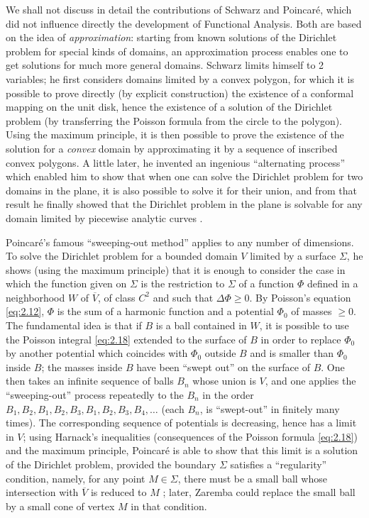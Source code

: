 \documentclass[12pt,a4paper,leqno,twoside]{extbook}
\begin{document}
We shall not discuss in detail the contributions of Schwarz and Poincaré, which did not influence directly the development of Functional Analysis. Both are based on the idea of \emph{approximation}: starting from known solutions of the Dirichlet problem for special kinds of domains, an approximation process enables one to get solutions for much more general domains. Schwarz limits himself to 2 variables; he first considers domains limited by a convex polygon, for which it is possible to prove directly (by explicit construction) the existence of a conformal mapping on the unit disk, hence the existence of a solution of the Dirichlet problem (by transferring the Poisson formula from the circle to the polygon). Using the maximum principle, it is then possible to prove the existence of the solution for a \emph{convex} domain by approximating it by a sequence of inscribed convex polygons. A little later, he invented an ingenious ``alternating process'' which enabled him to show that when one can solve the Dirichlet problem for two domains in the plane, it is also possible to solve it for their union, and from that result he finally showed that the Dirichlet problem in the plane is solvable for any domain limited by piecewise analytic curves \cite[vol.~II, p.~133--210]{196}.

Poincaré's famous ``sweeping-out method'' applies to any number of dimensions. To solve the Dirichlet problem for a bounded domain \(V\) limited by a surface \(\Sigma\), he shows (using the maximum principle) that it is enough to consider the case in which the function given on \(\Sigma\) is the restriction to \(\Sigma\) of a function \(\Phi\) defined in a neighborhood \(W\) of \(\overline{V}\), of class \(C^2\) and such that \(\Delta\Phi \geq 0\). By Poisson's equation \eqref{eq:2.12}, \(\Phi\) is the sum of a harmonic function and a potential \(\Phi_0\) of masses \(\geq 0\). The fundamental idea is that if \(B\) is a ball contained in \(W\), it is possible to use the Poisson integral \eqref{eq:2.18} extended to the surface of \(B\) in order to replace \(\Phi_0\) by another potential which coincides with \(\Phi_0\) outside \(B\) and is smaller than \(\Phi_0\) inside \(B\); the masses inside \(B\) have been ``swept out'' on the surface of \(B\). One then takes an infinite sequence of balls \(B_n\) whose union is \(V\), and one applies the ``sweeping-out'' process repeatedly to the \(B_n\) in the order \(B_1, B_2, B_1, B_2, B_3, B_1, B_2, B_3, B_4, \ldots\) (each \(B_n\), is ``swept-out'' in finitely many times). The corresponding sequence of potentials is decreasing, hence has a limit in \(V\); using Harnack's inequalities (consequences of the Poisson formula \eqref{eq:2.18}) and the maximum principle, Poincaré is able to show that this limit is a solution of the Dirichlet problem, provided the boundary \(\Sigma\) satisfies a ``regularity'' condition, namely, for any point \(M \in \Sigma\), there must be a small ball whose intersection with \(\overline{V}\) is reduced to \(M\) \cite[vol.~IX, p.~33--54]{177}; later, Zaremba could replace the small ball by a small cone of vertex \(M\) in that condition.
\end{document}
